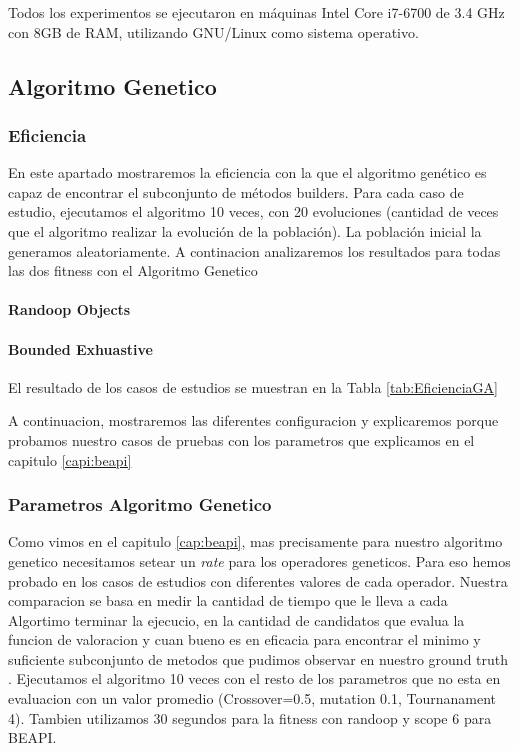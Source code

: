 Todos los experimentos se ejecutaron en máquinas Intel Core i7-6700 de 3.4 GHz con 8GB de RAM, utilizando GNU/Linux como sistema operativo.



\subsection{Algoritmo Genetico}

\subsubsection{Eficiencia}

En este apartado mostraremos la eficiencia con la que el algoritmo genético es capaz de encontrar el subconjunto de métodos builders. Para cada caso de estudio, ejecutamos el algoritmo 10 veces, con 20 evoluciones (cantidad de veces que el algoritmo realizar la evolución de la población). La población inicial la generamos aleatoriamente. 
A continacion analizaremos los resultados para todas las dos fitness con el Algoritmo Genetico

\paragraph{Randoop Objects}
\label{sec:randoopObjectsExp}




\paragraph{Bounded Exhuastive}
\label{sec:BEExp}


El resultado de los casos de estudios se muestran en la Tabla \ref{tab:EficienciaGA} 






A continuacion, mostraremos las diferentes configuracion y explicaremos porque probamos nuestro casos de pruebas con los parametros que explicamos en el capitulo \ref{capi:beapi}

\subsubsection{Parametros Algoritmo Genetico}

Como vimos en el capitulo \ref{cap:beapi}, mas precisamente  para nuestro algoritmo genetico necesitamos setear un \emph{rate} para los operadores geneticos. Para eso hemos probado en los casos de estudios con diferentes valores de cada operador. Nuestra comparacion se basa en medir la cantidad de tiempo que le lleva a cada Algortimo terminar la ejecucio, en la cantidad de candidatos que evalua la funcion de valoracion y cuan bueno es en eficacia para encontrar el minimo y suficiente subconjunto de metodos que pudimos observar en nuestro ground truth . Ejecutamos el algoritmo 10 veces con el resto de los parametros que no esta en evaluacion con un valor promedio (Crossover=0.5, mutation 0.1, Tournanament 4).
Tambien utilizamos 30 segundos para la fitness con randoop y scope 6 para BEAPI.

